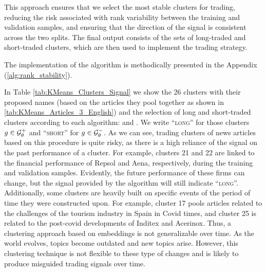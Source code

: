 This approach ensures that we select the most stable clusters for trading, reducing the risk associated with rank variability between the training and validation samples, and ensuring that the direction of the signal is consistent across the two splits. The final output consists of the sets of long-traded and short-traded clusters, which are then used to implement the trading strategy.


The implementation of the algorithm is methodically presented in the Appendix (\cref{alg:rank_stability}).





In Table \ref{tab:KMeans_Clusters_Signal} we show the 26 clusters with their proposed names (based on the articles they pool together as shown in \cref{tab:KMeans_Articles_3_English}) and the selection of long and short-traded clusters according to each algorithm:  and . We write ``\textsc{long}'' for those clusters $g\in\mathcal{G}_\theta^+$ and ``\textsc{short}'' for $g\in\mathcal{G}_\theta^-$. 
%
As we can see, trading clusters of news articles based on this procedure is quite risky, as there is a high reliance of the signal on the past performance of a cluster. For example, clusters 21 and 22 are linked to the financial performance of Repsol and Aena, respectively, during the training and validation samples. Evidently, the future performance of these firms can change, but the signal provided by the algorithm will still indicate ``\textsc{long}''. 
%
Additionally, some clusters are heavily built on specific events of the period of time they were constructed upon. For example, cluster 17 pools articles related to the challenges of the tourism industry in Spain in Covid times, and cluster 25 is related to the post-covid developments of Inditex and Acerinox. Thus, a clustering approach based on embeddings is not generalizable over time. As the world evolves, topics become outdated and new topics arise. However, this clustering technique is not flexible to these type of changes and is likely to produce misguided trading signals over time. 

